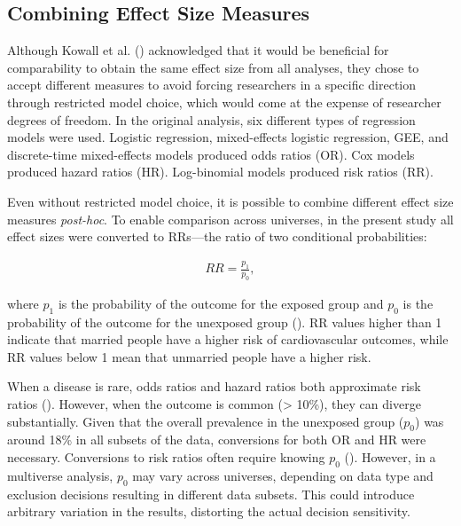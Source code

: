 \documentclass[
  man,
  floatsintext,
  longtable,
  nolmodern,
  notxfonts,
  notimes,
  colorlinks=true,linkcolor=blue,citecolor=blue,urlcolor=blue]{apa7}
\begin{document}
\subsection{Combining Effect Size
Measures}\label{combining-effect-size-measures}

Although Kowall et al. ()
acknowledged that it would be beneficial for comparability to obtain the
same effect size from all analyses, they chose to accept different
measures to avoid forcing researchers in a specific direction through
restricted model choice, which would come at the expense of researcher
degrees of freedom. In the original analysis, six different types of
regression models were used. Logistic regression, mixed-effects logistic
regression, GEE, and discrete-time mixed-effects models produced odds
ratios (OR). Cox models produced hazard ratios (HR). Log-binomial models
produced risk ratios (RR).

Even without restricted model choice, it is possible to combine
different effect size measures \emph{post-hoc}. To enable comparison
across universes, in the present study all effect sizes were converted
to RRs---the ratio of two conditional probabilities:

\begin{align}
  RR = \frac{p_1}{p_0},
\end{align}

where \(p_1\) is the probability of the outcome for the exposed group
and \(p_0\) is the probability of the outcome for the unexposed group
().
RR values higher than 1 indicate that married people have a higher risk
of cardiovascular outcomes, while RR values below 1 mean that unmarried
people have a higher risk.

When a disease is rare, odds ratios and hazard ratios both approximate
risk ratios (). However, when the outcome is common (\textgreater{} 10\%), they
can diverge substantially. Given that the overall prevalence in the
unexposed group (\(p_0\)) was around 18\% in all subsets of the data,
conversions for both OR and HR were necessary. Conversions to risk
ratios often require knowing \(p_0\)
(). However, in a
multiverse analysis, \(p_0\) may vary across universes, depending on
data type and exclusion decisions resulting in different data subsets.
This could introduce arbitrary variation in the results, distorting the
actual decision sensitivity.
\end{document}
